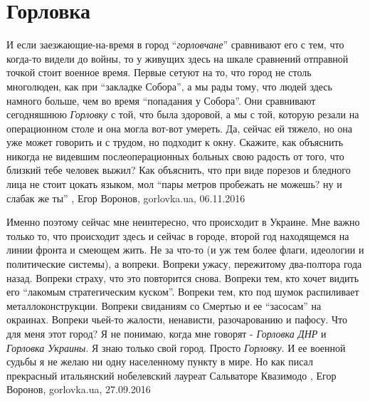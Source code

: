  
 
 
 
 
\chapter{Горловка}
\label{sec:slova.gorlovka}

И если заезжающие-на-время в город \enquote{\emph{горловчане}} сравнивают его с тем,
что когда-то видели до войны, то у живущих здесь на шкале сравнений отправной
точкой стоит военное время. Первые сетуют на то, что город не столь многолюден,
как при \enquote{закладке Собора}, а мы рады тому, что людей здесь намного
больше, чем во время \enquote{попадания у Собора}. Они сравнивают сегодняшнюю
\emph{Горловку} с той, что была здоровой, а мы с той, которую резали на
операционном столе и она могла вот-вот умереть. Да, сейчас ей тяжело, но она
уже может говорить и с трудом, но подходит к окну. Скажите, как объяснить
никогда не видевшим послеоперационных больных свою радость от того, что близкий
тебе человек выжил? Как объяснить, что при виде порезов и бледного лица не
стоит цокать языком, мол \enquote{пары метров пробежать не можешь? ну и слабак
же ты}
, 
Егор Воронов, gorlovka.ua, 06.11.2016

Именно поэтому сейчас мне неинтересно, что происходит в Украине. Мне важно
только то, что происходит здесь и сейчас в городе, второй год находящемся на
линии фронта и смеющем жить. Не за что-то (и уж тем более флаги, идеологии и
политические системы), а вопреки. Вопреки ужасу, пережитому два-полтора года
назад. Вопреки страху, что это повторится снова. Вопреки тем, кто хочет видить
его \enquote{лакомым стратегическим куском}. Вопреки тем, кто под шумок распиливает
металлоконструкции. Вопреки свиданиям со Смертью и ее \enquote{засосам} на окраинах.
Вопреки чьей-то жалости, ненависти, разочарованию и пафосу. Что для меня этот
город? Я не понимаю, когда мне говорят - \emph{Горловка ДНР} и \emph{Горловка Украины}. Я
знаю только свой город. Просто \emph{Горловку}. И ее военной судьбы я не желаю ни одну
населенному пункту в мире. Но как писал прекрасный итальянский нобелевский
лауреат Сальваторе Квазимодо
, 
Егор Воронов, gorlovka.ua, 27.09.2016

